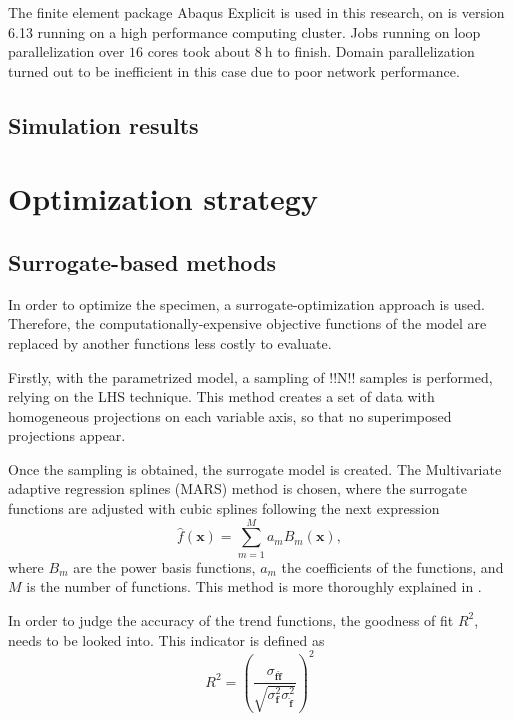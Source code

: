 \documentclass[cmfonts]{witpress}
\begin{document}
The finite element package Abaqus Explicit is used in this research, on is version 6.13 \cite{Abaqus613Manual} running on a high performance computing cluster. Jobs running on loop parallelization over $16$ cores took about $\SI{8}{\hour}$ to finish. Domain parallelization turned out to be inefficient in this case due to poor network performance.

\subsection{Simulation results}


\section{Optimization strategy}




\subsection{Surrogate-based methods}

In order to optimize the specimen, a surrogate-optimization approach is used. Therefore, the computationally-expensive  objective functions of the model are replaced by another functions less costly to evaluate. 

Firstly, with the parametrized model, a sampling of !!N!! samples is performed, relying on the LHS technique. This method creates a set of data with homogeneous projections on each variable axis, so that no superimposed projections appear. 

Once the sampling is obtained, the surrogate model is created. The Multivariate adaptive regression splines (MARS) method is chosen, where the surrogate functions are adjusted with cubic splines following the next expression
\begin{equation}\label{eq:mars}
\hat{f}\left ( \bm{x} \right )= \sum_{m=1}^{M}a_{m}B_{m}\left ( \bm{x} \right ),
\end{equation}
where $B_{m}$ are the power basis functions, $a_{m}$ the coefficients of the functions, and $M$ is the number of functions. This method is more thoroughly explained in \cite{Friedman1995197}. 

In order to judge the accuracy of the trend functions, the goodness of fit $R^2$, needs to be looked into. This indicator is defined as
\begin{equation}\label{eq:correlation_coefficient}
  R^2 = {\left(\dfrac{\sigma_{\bm{f}
\bm{\hat{f}}}}{\sqrt{\sigma_{\bm{f}}^2
\sigma_{\bm{\hat{f}}}^2}}\right)}^2
\end{equation}
\end{document}
